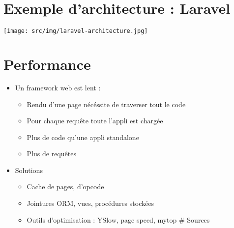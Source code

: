 \hypertarget{exemple-darchitecture-laravel}{%
\section{Exemple d'architecture :
Laravel}\label{exemple-darchitecture-laravel}}

\texttt{[image: src/img/laravel-architecture.jpg]}

\hypertarget{performance}{%
\section{Performance}\label{performance}}

\begin{itemize}
\tightlist
\item
  Un framework web est lent :

  \begin{itemize}
  \tightlist
  \item
    Rendu d'une page nécéssite de traverser tout le code
  \item
    Pour chaque requête toute l'appli est chargée
  \item
    Plus de code qu'une appli standalone
  \item
    Plus de requêtes
  \end{itemize}
\item
  Solutions

  \begin{itemize}
  \tightlist
  \item
    Cache de pages, d'opcode
  \item
    Jointures ORM, vues, procédures stockées
  \item
    Outils d'optimisation : YSlow, page speed, mytop \# Sources
  \end{itemize}
\end{itemize}
